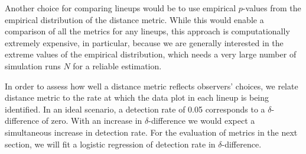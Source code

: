 \documentclass[12pt]{article}\usepackage[]{graphicx}\usepackage[]{color}
\newcommand{\hh}[1]{{\color{magenta} #1}}
\newcommand{\dc}[1]{{\color{orange} #1}}
\begin{document}
Another choice for comparing lineups would be to use empirical $p$-values from the empirical distribution of the distance metric. While this would enable a comparison of all the metrics for any lineups, this approach is computationally extremely expensive, in particular, because we are generally interested in the extreme values of the empirical distribution, which needs a very large number of simulation runs $N$ for a reliable estimation.

% 

In order to assess how well a distance metric reflects observers' choices, we relate distance metric to the rate at which the data plot in each lineup is being identified. In an ideal scenario, a detection rate of 0.05 corresponds to a $\delta$-difference of zero. With an increase in $\delta$-difference we would expect a simultaneous increase in detection rate. For the evaluation of metrics in the next section, we will fit a logistic regression of detection rate in $\delta$-difference. 
\end{document}

